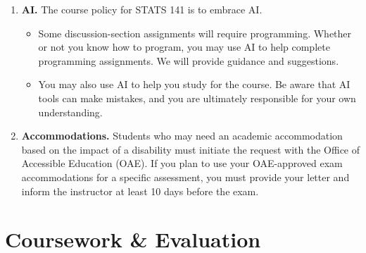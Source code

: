 \documentclass[
  letterpaper,
  DIV=11,
  numbers=noendperiod]{scrreprt}
\providecommand{\tightlist}{%
  \setlength{\itemsep}{0pt}\setlength{\parskip}{0pt}}
\begin{document}
\begin{enumerate}
  If you have any installation difficulties or questions, please ask
  your TAs.
\item
  \textbf{AI.} The course policy for STATS 141 is to embrace AI.

  \begin{itemize}
  \tightlist
  \item
    Some discussion-section assignments will require programming.
    Whether or not you know how to program, you may use AI to help
    complete programming assignments. We will provide guidance and
    suggestions.
  \item
    You may also use AI to help you study for the course. Be aware that
    AI tools can make mistakes, and you are ultimately responsible for
    your own understanding.
  \end{itemize}
\item
  \textbf{Accommodations.} Students who may need an academic
  accommodation based on the impact of a disability must initiate the
  request with the Office of Accessible Education (OAE). If you plan to
  use your OAE-approved exam accommodations for a specific assessment,
  you must provide your letter and inform the instructor at least 10
  days before the exam.
\end{enumerate}

\section*{Coursework \& Evaluation}\label{coursework-evaluation}

\end{document}

